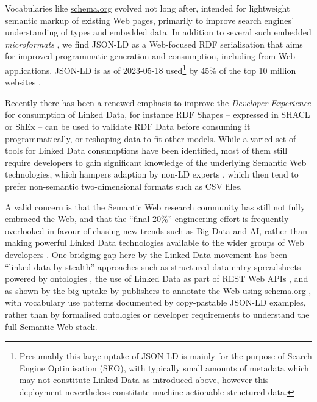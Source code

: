 \documentclass[fleqn,10pt,NOlineno]{wlpeerjlua}
\begin{document}
Vocabularies like \href{https://schema.org/}{schema.org} evolved not long after, intended for lightweight semantic markup of existing Web pages, primarily to improve search engines' understanding of types and embedded data. In addition to several such embedded \emph{microformats} \autocite{OpenGraphProtocol,w3-rdfa-primer,HTMLStandard}, we find JSON-LD \autocite{w3-json-ld} as a Web-focused RDF serialisation that aims for improved programmatic generation and consumption, including from Web applications. JSON-LD is as of 2023-05-18 used\footnote{Presumably this large uptake of JSON-LD is mainly for the purpose of Search Engine Optimisation (SEO), with typically small amounts of metadata which may not constitute Linked Data as introduced above, however this deployment nevertheless constitute machine-actionable structured data.} by 45\% of the top 10 million websites \autocite{UsageStatisticsJSONLD}.

Recently there has been a renewed emphasis to improve the \emph{Developer Experience} \autocite{DesigningLinkedData2018} for consumption of Linked Data, for instance RDF Shapes -- expressed in SHACL \autocite{w3-shacl} or ShEx \autocite{ShapeExpressionsShEx} -- can be used to validate RDF Data \autocite{gayoValidatingRDFData2017a,thorntonUsingShapeExpressions2019a} before consuming it programmatically, or reshaping data to fit other models. While a varied set of tools for Linked Data consumptions have been identified, most of them still require developers to gain significant knowledge of the underlying Semantic Web technologies, which hampers adaption by non-LD experts \autocite{klimekSurveyToolsLinked2019a}, which then tend to prefer non-semantic two-dimensional formats such as CSV files.

A valid concern is that the Semantic Web research community has still not fully embraced the Web, and that the ``final 20\%'' engineering effort is frequently overlooked in favour of chasing new trends such as Big Data and AI, rather than making powerful Linked Data technologies available to the wider groups of Web developers \autocite{verborghSemanticWebIdentity2020a}. One bridging gap here by the Linked Data movement has been ``linked data by stealth'' approaches such as structured data entry spreadsheets powered by ontologies \autocite{wolstencroftRightFieldEmbeddingOntology2011b}, the use of Linked Data as part of REST Web APIs \autocite{pageRESTLinkedData2011}, and as shown by the big uptake by publishers to annotate the Web using schema.org \autocite{bernsteinNewLookSemantic2016a}, with vocabulary use patterns documented by copy-pastable JSON-LD examples, rather than by formalised ontologies or developer requirements to understand the full Semantic Web stack.
\end{document}
